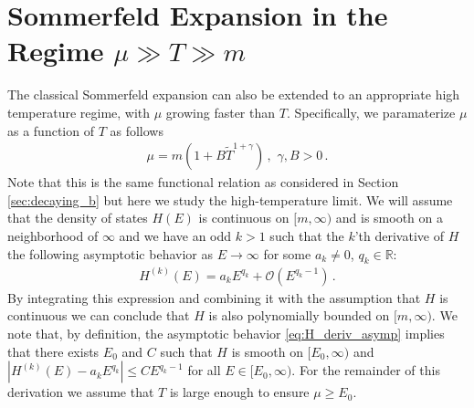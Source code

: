 \documentclass[sn-mathphys,Numbered]{sn-jnl}
\begin{document}
\section{Sommerfeld Expansion in the Regime $\mu\gg T\gg m$}\label{Section:HighTempSommerfeld}
The classical Sommerfeld expansion can also be extended to an appropriate high temperature regime, with $\mu$ growing faster than $T$.  Specifically, we paramaterize $\mu$ as a function of $T$ as follows
\begin{align}\label{eq:mu_infinity_faster}
\mu=m(1+B\widetilde{T}^{1+\gamma}) \,,\,\,\gamma,B>0\,.   
\end{align}
Note that this is the same functional relation as considered in Section \ref{sec:decaying_b} but here we study the high-temperature limit.  We will assume that the density of states $H(E)$ is continuous on $[m,\infty)$ and is smooth on a neighborhood of $\infty$ and we have an odd $k>1$ such that the $k$'th derivative of $H$ the following asymptotic behavior as $E\to\infty$ for some $a_k\neq 0$, $q_k\in\mathbb{R}$:
\begin{align}\label{eq:H_deriv_asymp}
    H^{(k)}(E)=a_kE^{q_k}+ \mathcal{O}(E^{q_k-1})\,.
\end{align}
By integrating this expression and combining it with the assumption that $H$ is continuous we can conclude that $H$ is also polynomially bounded on $[m,\infty)$. We note that, by definition, the asymptotic behavior \eqref{eq:H_deriv_asymp} implies that there exists $E_0$ and $C$ such that $H$ is smooth on $[E_0,\infty)$ and $|H^{(k)}(E)-a_kE^{q_k}|\leq CE^{q_k-1}$ for all $E\in[E_0,\infty)$. For the remainder of this derivation we assume that $T$ is large enough to ensure $\mu\geq E_0$. 
\end{document}
